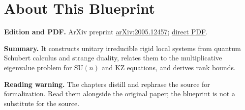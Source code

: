 

\chapter*{About This Blueprint}
\label{rigid-local-systems-multiplicative-eigenvalue-problem-about}


\textbf{Edition and PDF.} ArXiv preprint \href{https://arxiv.org/abs/2005.12457}{arXiv:2005.12457}; \href{https://arxiv.org/pdf/2005.12457}{direct PDF}.

\textbf{Summary.} It constructs unitary irreducible rigid local systems from quantum Schubert calculus and strange duality, relates them to the multiplicative eigenvalue problem for $\mathrm{SU}(n)$ and KZ equations, and derives rank bounds.

\textbf{Reading warning.} The chapters distill and rephrase the source for formalization. Read them alongside the original paper; the blueprint is not a substitute for the source.



















